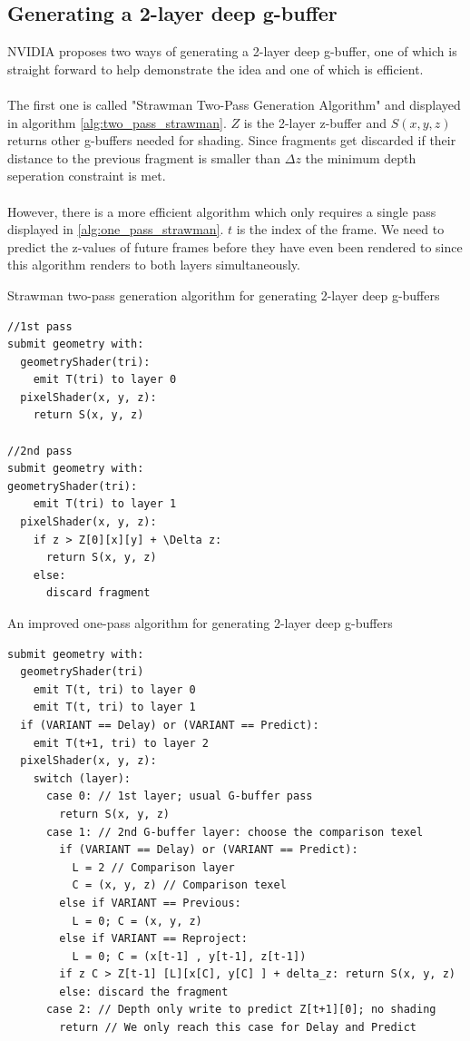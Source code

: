 \documentclass{ACGSeminar}
\begin{document}
	\subsection{Generating a 2-layer deep g-buffer}
		NVIDIA proposes two ways of generating a 2-layer deep g-buffer, one of which is straight forward to help demonstrate the idea and one of which is efficient. \\\\
		The first one is called "Strawman Two-Pass Generation Algorithm" and displayed in algorithm \ref{alg:two_pass_strawman}. $Z$ is the 2-layer z-buffer and $S(x, y, z)$ returns other g-buffers needed for shading. Since fragments get discarded if their distance to the previous fragment is smaller than $\Delta z$ the minimum depth seperation constraint is met. \\\\
		However, there is a more efficient algorithm which only requires a single pass displayed in \ref{alg:one_pass_strawman}. $t$ is the index of the frame. We need to predict the z-values of future frames before they have even been rendered to since this algorithm renders to both layers simultaneously.
		\begin{algorithm} \label{alg:two_pass_strawman} \caption{Strawman two-pass generation algorithm for generating 2-layer deep g-buffers}
		\begin{lstlisting}[frame=single]
//1st pass
submit geometry with:
  geometryShader(tri):
    emit T(tri) to layer 0
  pixelShader(x, y, z):
    return S(x, y, z)

//2nd pass
submit geometry with:
geometryShader(tri):
    emit T(tri) to layer 1
  pixelShader(x, y, z):
    if z > Z[0][x][y] + \Delta z:
      return S(x, y, z)
    else:
      discard fragment
		\end{lstlisting}
		\end{algorithm}
		 
		\begin{algorithm} \label{alg:one_pass_strawman} \caption{An improved one-pass algorithm for generating 2-layer deep g-buffers}
		\begin{lstlisting}[frame=single]
submit geometry with:
  geometryShader(tri)
    emit T(t, tri) to layer 0
    emit T(t, tri) to layer 1
  if (VARIANT == Delay) or (VARIANT == Predict):
    emit T(t+1, tri) to layer 2
  pixelShader(x, y, z):
    switch (layer):
      case 0: // 1st layer; usual G-buffer pass
        return S(x, y, z)
      case 1: // 2nd G-buffer layer: choose the comparison texel
        if (VARIANT == Delay) or (VARIANT == Predict):
          L = 2 // Comparison layer
          C = (x, y, z) // Comparison texel
        else if VARIANT == Previous:
          L = 0; C = (x, y, z)
        else if VARIANT == Reproject:
          L = 0; C = (x[t-1] , y[t-1], z[t-1])
        if z C > Z[t-1] [L][x[C], y[C] ] + delta_z: return S(x, y, z)
        else: discard the fragment
      case 2: // Depth only write to predict Z[t+1][0]; no shading
        return // We only reach this case for Delay and Predict
		\end{lstlisting}
		\end{algorithm}
\end{document}
